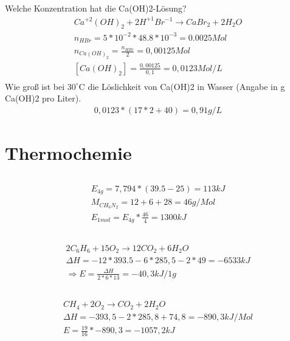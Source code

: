 \documentclass[a4paper]{article}
\begin{document}
\subsection{}
Welche Konzentration hat die Ca(OH)2-Lösung?
\begin{align}
  Ca^{+2}(OH)_2 + 2 H^{+1}Br^{-1} \rightarrow CaBr_2 + 2 H_2O\\
  n_{HBr}=5*10^{-2}*48.8*10^{-3}= 0.0025Mol\\  
  n_{Ca(OH)_2}=\frac{n_{HBr}}{2} = 0,00125 Mol\\
  [Ca(OH)_2]=\frac{0,00125}{0,1}=0,0123 Mol/L\\
\end{align}
Wie groß ist bei $30^\circ$C die Löslichkeit von Ca(OH)2 in Wasser (Angabe in g Ca(OH)2 pro Liter).
\begin{align}
  0,0123*(17*2+40)=0,91 g/L
\end{align}

\section{Thermochemie}
\subsection{}
\begin{align}
  E_{4g}=7,794*(39.5-25)= 113 kJ\\
  M_{CH_6N_2}=12+6+28=46g/Mol\\
  E_{1mol}=E_{4g}*\frac{46}{4}=1300 kJ
\end{align}

\subsection{}
\begin{align}
  2 C_6H_6 + 15 O_2 \rightarrow 12 CO_2 + 6 H_2O\\
  \Delta H = -12*393.5 - 6*285,5 - 2*49 = -6533 kJ\\
  \Rightarrow E = \frac{\Delta H}{2*6*13}=-40,3 kJ/1g
\end{align}

\subsection{}
\begin{align}
  CH_4 + 2 O_2 \rightarrow CO_2 + 2 H_2O\\
  \Delta H = -393,5 -2*285,8+74,8 = -890,3 kJ/Mol\\
  E = \frac{19}{16}*-890,3 = -1057,2kJ
\end{align}
\end{document}
